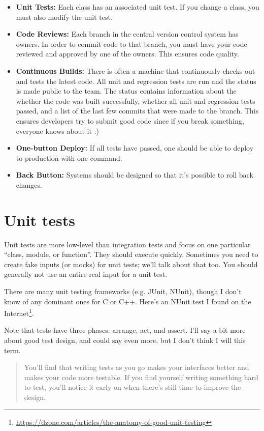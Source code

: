 \documentclass[11pt]{article}
\begin{document}
\begin{itemize}[noitemsep]

\item \textbf{Unit Tests:} Each class has an associated unit test. If you change a class, you must also modify the unit test.
\item \textbf{Code Reviews:} Each branch in the central version control system has owners. In order to commit code to that branch, you must have your code reviewed and approved by one of the owners. This ensures code quality.
\item \textbf{Continuous Builds:} There is often a machine that continuously checks out and tests the latest code. All unit and regression tests are run and the status is made public to the team. The status contains information about the whether the code was built successfully, whether all unit and regression tests passed, and a list of the last few commits that were made to the branch. This ensures developers try to submit good code since if you break something, everyone knows about it :)
\item \textbf{One-button Deploy:} If all tests have passed, one should be able to deploy to production
with one command.
\item \textbf{Back Button:} Systems should be designed so that it's possible to roll back changes.
\end{itemize}

\section*{Unit tests}
Unit tests are more low-level than integration tests and focus on 
one particular ``class, module, or function''. They should execute quickly. Sometimes you 
need to create fake inputs (or mocks) for unit tests; we'll talk about that too. You should generally
not use an entire real input for a unit test.

There are many unit testing frameworks (e.g. JUnit, NUnit), though I don't know of any dominant ones for C or C++.
Here's an NUnit test I found on the Internet\footnote{\url{https://dzone.com/articles/the-anatomy-of-good-unit-testing}}.

Note that tests have three phases: arrange, act, and assert. I'll say a bit more about good test design, and could say even more, but I don't think I will this term.

\begin{quote}
You'll find that writing tests as you go makes your interfaces better and makes your code more testable. If you find yourself writing something hard to test, you'll notice it early on when there's still time to improve the design.
\end{quote}
\end{document}
